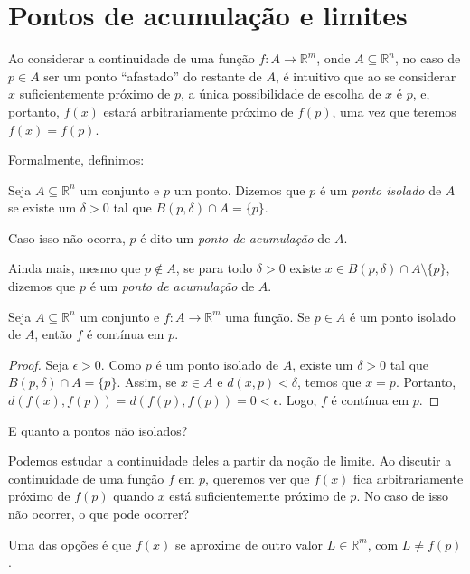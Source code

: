 \section{Pontos de acumulação e limites}
Ao considerar a continuidade de uma função $f: A \to \mathbb R^m$, onde $A\subseteq \mathbb R^n$, no caso de $p \in A$ ser um ponto ``afastado'' do restante de $A$, é intuitivo que ao se considerar $x$ suficientemente próximo de $p$, a única possibilidade de escolha de $x$ é $p$, e, portanto, $f(x)$ estará arbitrariamente próximo de $f(p)$, uma vez que teremos $f(x)=f(p)$.

Formalmente, definimos:

\begin{definition}
    Seja $A\subseteq \mathbb R^n$ um conjunto e $p$ um ponto. Dizemos que $p$ é um \emph{ponto isolado}  de $A$ se existe um $\delta>0$ tal que $B(p,\delta) \cap A = \{p\}$.

    Caso isso não ocorra, $p$ é dito um \emph{ponto de acumulação}  de $A$.

    Ainda mais, mesmo que $p \notin A$, se para todo $\delta>0$ existe $x \in B(p,\delta) \cap A\setminus\{p\}$, dizemos que $p$ é um \emph{ponto de acumulação} de $A$.
\end{definition}

\begin{proposition}
    Seja $A\subseteq \mathbb R^n$ um conjunto e $f: A \to \mathbb R^m$ uma função. Se $p \in A$ é um ponto isolado de $A$, então $f$ é contínua em $p$.
\end{proposition}

\begin{proof}
    Seja $\epsilon>0$. Como $p$ é um ponto isolado de $A$, existe um $\delta>0$ tal que $B(p,\delta) \cap A = \{p\}$. Assim, se $x \in A$ e $d(x, p) < \delta$, temos que $x = p$. Portanto, $d(f(x), f(p)) = d(f(p), f(p)) = 0 < \epsilon$. Logo, $f$ é contínua em $p$.
\end{proof}

E quanto a pontos não isolados?

Podemos estudar a continuidade deles a partir da noção de limite.
Ao discutir a continuidade de uma função $f$ em $p$, queremos ver que $f(x)$ fica arbitrariamente próximo de $f(p)$ quando $x$ está suficientemente próximo de $p$.
No caso de isso não ocorrer, o que pode ocorrer?

Uma das opções é que $f(x)$ se aproxime de outro valor $L \in \mathbb R^m$, com $L \neq f(p)$.

